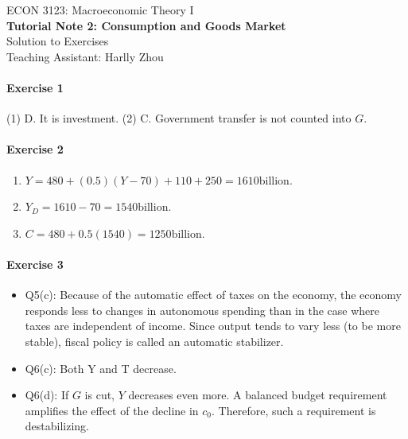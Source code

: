 \documentclass[12pt]{article}
\numberwithin{equation}{section}
\begin{document}
\begin{center}
    ECON 3123: Macroeconomic Theory I\\
    {\large \textbf{Tutorial Note 2: Consumption and Goods Market}}\\
    Solution to Exercises\\
    Teaching Assistant: Harlly Zhou
\end{center}

\paragraph{Exercise 1}
(1) D. It is investment. (2) C. Government transfer is not counted into $G$.

\paragraph{Exercise 2}
\begin{enumerate}[label=\alph*.]
    \item $Y=480+(0.5)(Y-70)+110+250=1610\text{billion}$.
    \item $Y_D = 1610 - 70 = 1540\text{billion}$.
    \item $C = 480 + 0.5(1540) = 1250 \text{billion}$.
\end{enumerate}

\paragraph{Exercise 3}
\begin{itemize}
    \item Q5(c): Because of the automatic effect of taxes on the economy, the economy responds less to changes in autonomous spending than in the case where taxes are independent of income. Since output tends to vary less (to be more stable), fiscal policy is called an automatic stabilizer.
    \item Q6(c): Both Y and T decrease.
    \item Q6(d): If $G$ is cut, $Y$ decreases even more. A balanced budget requirement amplifies the effect of the decline in $c_0$. Therefore, such a requirement is destabilizing.
\end{itemize}
\end{document}
